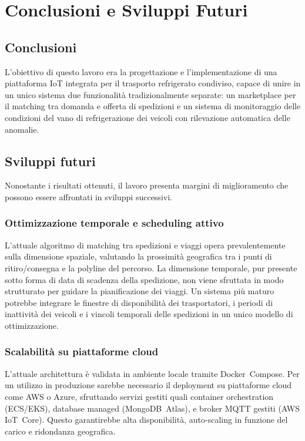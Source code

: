 \chapter{Conclusioni e Sviluppi Futuri}
\label{ch:conclusioni}

\section{Conclusioni}

L'obiettivo di questo lavoro era la progettazione e l'implementazione di una piattaforma IoT integrata per il trasporto refrigerato condiviso, capace di unire in un unico sistema due funzionalità tradizionalmente separate: un marketplace per il matching tra domanda e offerta di spedizioni e un sistema di monitoraggio delle condizioni del vano di refrigerazione dei veicoli con rilevazione automatica delle anomalie.


\section{Sviluppi futuri}

Nonostante i risultati ottenuti, il lavoro presenta margini di miglioramento che possono essere affrontati in sviluppi successivi.

\subsection{Ottimizzazione temporale e scheduling attivo}

L'attuale algoritmo di matching tra spedizioni e viaggi opera prevalentemente sulla dimensione spaziale, valutando la prossimità geografica tra i punti di ritiro/consegna e la polyline del percorso. La dimensione temporale, pur presente sotto forma di data di scadenza della spedizione, non viene sfruttata in modo strutturato per guidare la pianificazione dei viaggi. Un sistema più maturo potrebbe integrare le finestre di disponibilità dei trasportatori, i periodi di inattività dei veicoli e i vincoli temporali delle spedizioni in un unico modello di ottimizzazione.
\subsection{Scalabilità su piattaforme cloud}

L'attuale architettura è validata in ambiente locale tramite Docker~Compose. 
Per un utilizzo in produzione sarebbe necessario il deployment su piattaforme cloud come AWS o Azure, sfruttando servizi gestiti quali container orchestration (ECS/EKS), database managed (MongoDB~Atlas), e broker MQTT gestiti (AWS IoT~Core). Questo garantirebbe alta disponibilità, auto-scaling in funzione del carico e ridondanza geografica.

